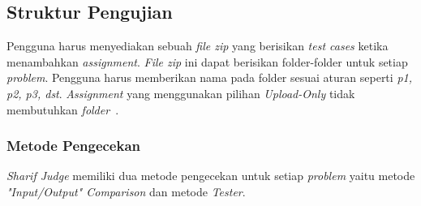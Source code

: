 \subsection{Struktur Pengujian}

Pengguna harus menyediakan sebuah \textit{file zip} yang berisikan \textit{test cases} ketika menambahkan \textit{assignment}. \textit{File zip} ini dapat berisikan folder-folder untuk setiap \textit{problem}. Pengguna harus memberikan nama pada folder sesuai aturan seperti \textit{p1, p2, p3, dst}. \textit{Assignment} yang menggunakan pilihan \textit{Upload-Only} tidak membutuhkan \textit{folder}~\cite{mjnaderi:14:sharifjudgedoc}.

\subsubsection{Metode Pengecekan}
\textit{Sharif Judge} memiliki dua metode pengecekan untuk setiap \textit{problem} yaitu metode \textit{"Input/Output" Comparison} dan metode \textit{Tester}.
